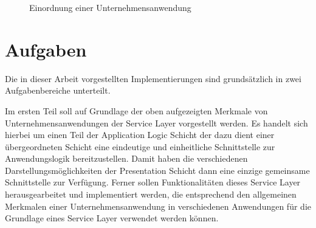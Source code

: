 \begin{figure}
	\caption{Einordnung einer Unternehmensanwendung}
	\label{ill:eaoverview}
\end{figure}

\section{Aufgaben}
Die in dieser Arbeit vorgestellten Implementierungen sind grundsätzlich in zwei
Aufgabenbereiche unterteilt.

Im ersten Teil soll auf Grundlage der oben aufgezeigten Merkmale von
Unternehmensanwendungen der Service Layer vorgestellt werden. Es handelt sich
hierbei um einen Teil der Application Logic Schicht der dazu dient einer
übergeordneten Schicht eine eindeutige und einheitliche Schnittstelle zur
Anwendungslogik bereitzustellen. Damit haben die verschiedenen
Darstellungsmöglichkeiten der Presentation Schicht dann eine einzige gemeinsame
Schnittstelle zur Verfügung. Ferner sollen Funktionalitäten dieses Service Layer
herausgearbeitet und implementiert werden, die entsprechend den allgemeinen
Merkmalen einer Unternehmensanwendung in verschiedenen Anwendungen für die
Grundlage eines Service Layer verwendet werden können.


